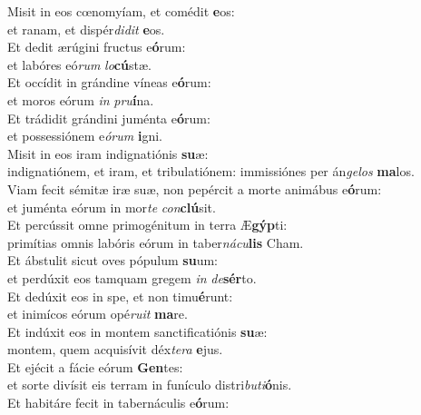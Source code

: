 \evenverse Misit in eos cœnomyíam, et comédit \textbf{e}os:~\*\\
\evenverse et ranam, et dispér\textit{di}\textit{dit} \textbf{e}os.\\
\oddverse Et dedit ærúgini fructus e\textbf{ó}rum:~\*\\
\oddverse et labóres eó\textit{rum} \textit{lo}\textbf{cú}stæ.\\
\evenverse Et occídit in grándine víneas e\textbf{ó}rum:~\*\\
\evenverse et moros eórum \textit{in} \textit{pru}\textbf{í}na.\\
\oddverse Et trádidit grándini juménta e\textbf{ó}rum:~\*\\
\oddverse et possessiónem e\textit{ó}\textit{rum} \textbf{i}gni.\\
\evenverse Misit in eos iram indignatiónis \textbf{su}æ:~\*\\
\evenverse indignatiónem, et iram, et tribulatiónem: immissiónes per án\textit{ge}\textit{los} \textbf{ma}los.\\
\oddverse Viam fecit sémitæ iræ suæ, non pepércit a morte animábus e\textbf{ó}rum:~\*\\
\oddverse et juménta eórum in mor\textit{te} \textit{con}\textbf{clú}sit.\\
\evenverse Et percússit omne primogénitum in terra Æ\textbf{gýp}ti:~\*\\
\evenverse primítias omnis labóris eórum in taber\textit{ná}\textit{cu}\textbf{lis} Cham.\\
\oddverse Et ábstulit sicut oves pópulum \textbf{su}um:~\*\\
\oddverse et perdúxit eos tamquam gregem \textit{in} \textit{de}\textbf{sér}to.\\
\evenverse Et dedúxit eos in spe, et non timu\textbf{é}runt:~\*\\
\evenverse et inimícos eórum opé\textit{ru}\textit{it} \textbf{ma}re.\\
\oddverse Et indúxit eos in montem sanctificatiónis \textbf{su}æ:~\*\\
\oddverse montem, quem acquisívit déx\textit{te}\textit{ra} \textbf{e}jus.\\
\evenverse Et ejécit a fácie eórum \textbf{Gen}tes:~\*\\
\evenverse et sorte divísit eis terram in funículo distri\textit{bu}\textit{ti}\textbf{ó}nis.\\
\oddverse Et habitáre fecit in tabernáculis e\textbf{ó}rum:~\*\\

